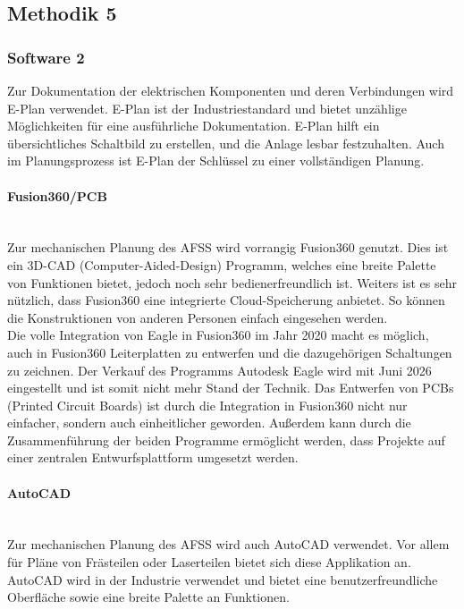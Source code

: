 \subsection{Methodik 5}

\subsubsection{Software 2}

Zur Dokumentation der elektrischen Komponenten und deren Verbindungen wird E-Plan verwendet. E-Plan ist der Industriestandard und bietet unzählige Möglichkeiten für eine ausführliche Dokumentation. E-Plan hilft ein übersichtliches Schaltbild zu erstellen, und die Anlage lesbar festzuhalten. Auch im Planungsprozess ist E-Plan der Schlüssel zu einer vollständigen Planung.

\paragraph{Fusion360/PCB}\mbox{}\\
Zur mechanischen Planung des AFSS wird vorrangig Fusion360 genutzt. Dies ist ein 3D-CAD (Computer-Aided-Design) Programm, welches eine breite Palette von Funktionen bietet, jedoch noch sehr bedienerfreundlich ist. Weiters ist es sehr nützlich, dass Fusion360 eine integrierte Cloud-Speicherung anbietet. So können die Konstruktionen von anderen Personen einfach eingesehen werden.\\

Die volle Integration von Eagle in Fusion360 im Jahr 2020 macht es möglich, auch in Fusion360 Leiterplatten zu entwerfen und die dazugehörigen Schaltungen zu zeichnen. Der Verkauf des Programms Autodesk Eagle wird mit Juni 2026 eingestellt und ist somit nicht mehr Stand der Technik.\cite{Eagle_in_Fusion} Das Entwerfen von PCBs (Printed Circuit Boards) ist durch die Integration in Fusion360 nicht nur einfacher, sondern auch einheitlicher geworden. Außerdem kann durch die Zusammenführung der beiden Programme ermöglicht werden, dass Projekte auf einer zentralen Entwurfsplattform umgesetzt werden.

\paragraph{AutoCAD}\mbox{}\\
Zur mechanischen Planung des AFSS wird auch AutoCAD verwendet. Vor allem für Pläne von Frästeilen oder Laserteilen bietet sich diese Applikation an. AutoCAD wird in der Industrie verwendet und bietet eine benutzerfreundliche Oberfläche sowie eine breite Palette an Funktionen.


